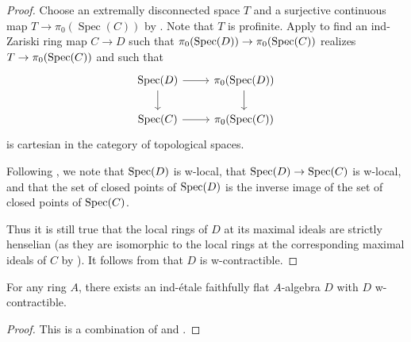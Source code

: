\begin{proof}
  Choose an extremally disconnected space $T$ and a surjective continuous map $T \to \pi_0(\operatorname{Spec}(C))$ by . Note that $T$ is profinite.
  Apply  to find an ind-Zariski ring map $C \to D$ such that $\pi_0(\operatorname{Spec} (D)) \to \pi_0(\operatorname{Spec} (C))$ realizes $T \to \pi_0(\operatorname{Spec} (C))$ and such that
  \[
  \begin{tikzcd}
  \operatorname{Spec}(D) \arrow[r] \arrow[d] & \pi_0(\operatorname{Spec}(D)) \arrow[d] \\
  \operatorname{Spec}(C) \arrow[r] & \pi_0(\operatorname{Spec}(C))
  \end{tikzcd}
  \]
  is cartesian in the category of topological spaces.

  Following , we note that $\operatorname{Spec} (D)$ is w-local, that $\operatorname{Spec} (D) \to \operatorname{Spec} (C)$ is w-local, and that the set of closed points of $\operatorname{Spec} (D)$ is the inverse image of the set of closed points of $\operatorname{Spec} (C)$.

  Thus it is still true that the local rings of $D$ at its maximal ideals are strictly henselian (as they are isomorphic to the local rings at the corresponding maximal ideals of $C$ by ). It follows from  that $D$ is w-contractible.
\end{proof}

\begin{theorem}
  For any ring $A$, there exists an ind-étale faithfully flat $A$-algebra $D$ with $D$ w-contractible.

  \label{thm:ind-etale-w-contractible-cover-exists}
\end{theorem}

\begin{proof}
  This is a combination of  and .
\end{proof}
